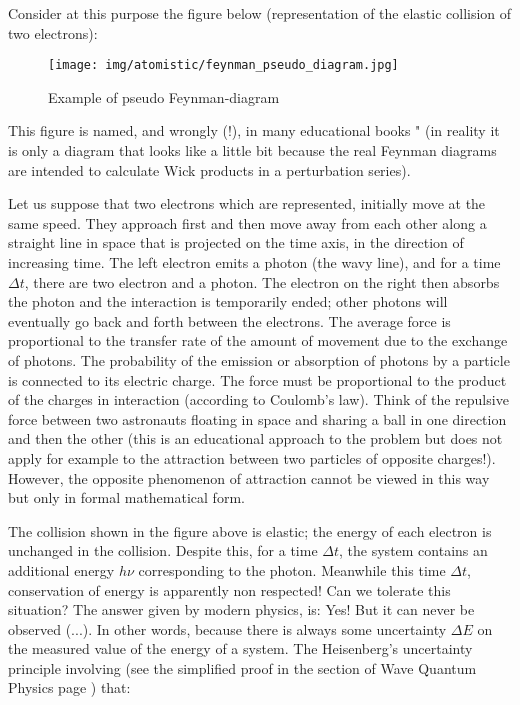 	Consider at this purpose the figure below (representation of the elastic collision of two electrons):
	\begin{figure}[H]
		\begin{center}
		\texttt{[image: img/atomistic/feynman\_pseudo\_diagram.jpg]}
		\end{center}	
		\caption{Example of pseudo Feynman-diagram}
	\end{figure}
	This figure is named, and wrongly (!), in many educational books " (in reality it is only a diagram that looks like a little bit because the real Feynman diagrams are intended to calculate Wick products in a perturbation series).
	
	Let us suppose that two electrons which are represented, initially move at the same speed. They approach first and then move away from each other along a straight line in space that is projected on the time axis, in the direction of increasing time. The left electron emits a photon (the wavy line), and for a time $\Delta t$, there are two electron and a photon. The electron on the right then absorbs the photon and the interaction is temporarily ended; other photons will eventually go back and forth between the electrons. The average force is proportional to the transfer rate of the amount of movement due to the exchange of photons. The probability of the emission or absorption of photons by a particle is connected to its electric charge. The force must be proportional to the product of the charges in interaction (according to Coulomb's law). Think of the repulsive force between two astronauts floating in space and sharing a ball in one direction and then the other (this is an educational approach to the problem but does not apply for example to the attraction between two particles of opposite charges!). However, the opposite phenomenon of attraction cannot be viewed in this way but only in formal mathematical form.
	
	The collision shown in the figure above is elastic; the energy of each electron is unchanged in the collision. Despite this, for a time $\Delta t$, the system contains an additional energy $h\nu$ corresponding to the photon. Meanwhile this time $\Delta t$, conservation of energy is apparently non respected! Can we tolerate this situation? The answer given by modern physics, is: Yes! But it can never be observed (...). In other words, because there is always some uncertainty $\Delta E$ on the measured value of the energy of a system. The Heisenberg's uncertainty principle involving (see the simplified proof in the section of Wave Quantum Physics page \pageref{heisenberg uncertainty principle}) that:
	
